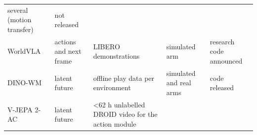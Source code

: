 \documentclass[
  10pt,
  english,
]{article}
\begin{document}
\begin{longtable}[]{@{}lllll@{}}
\begin{minipage}[t]{0.17\columnwidth}
several (motion transfer)\strut
\end{minipage} & \begin{minipage}[t]{0.17\columnwidth}\raggedright
not released\strut
\end{minipage}\tabularnewline
\begin{minipage}[t]{0.17\columnwidth}\raggedright
WorldVLA \citep{worldvla}\strut
\end{minipage} & \begin{minipage}[t]{0.17\columnwidth}\raggedright
actions and next frame\strut
\end{minipage} & \begin{minipage}[t]{0.17\columnwidth}\raggedright
LIBERO demonstrations\strut
\end{minipage} & \begin{minipage}[t]{0.17\columnwidth}\raggedright
simulated arm\strut
\end{minipage} & \begin{minipage}[t]{0.17\columnwidth}\raggedright
research code announced\strut
\end{minipage}\tabularnewline
\begin{minipage}[t]{0.17\columnwidth}\raggedright
DINO-WM \citep{dino_wm}\strut
\end{minipage} & \begin{minipage}[t]{0.17\columnwidth}\raggedright
latent future\strut
\end{minipage} & \begin{minipage}[t]{0.17\columnwidth}\raggedright
offline play data per environment\strut
\end{minipage} & \begin{minipage}[t]{0.17\columnwidth}\raggedright
simulated and real arms\strut
\end{minipage} & \begin{minipage}[t]{0.17\columnwidth}\raggedright
code released\strut
\end{minipage}\tabularnewline
\begin{minipage}[t]{0.17\columnwidth}\raggedright
V-JEPA 2-AC \citep{vjepa2}\strut
\end{minipage} & \begin{minipage}[t]{0.17\columnwidth}\raggedright
latent future\strut
\end{minipage} & \begin{minipage}[t]{0.17\columnwidth}\raggedright
\textless62 h unlabelled DROID video for the action module\strut
\end{minipage} & \begin{minipage}[t]{0.17\columnwidth}\raggedright

\end{minipage}
\end{longtable}
\end{document}
